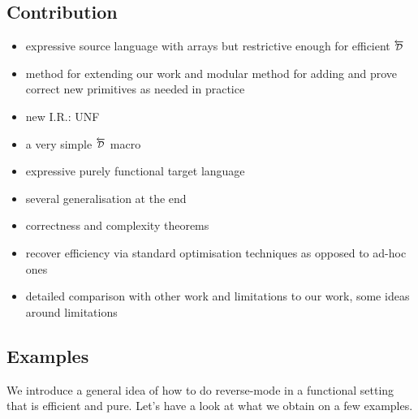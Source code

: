 \subsection{Contribution}

\begin{itemize}
    \item expressive source language with arrays but restrictive enough for efficient $\Dsynrevsymbol$
    \item method for extending our work and modular method for adding and prove correct new primitives as needed in practice 
    \item new I.R.: UNF
    \item a very simple $\Dsynrevsymbol$ macro
    \item expressive purely functional target language
    \item several generalisation at the end
    \item correctness and complexity theorems
    \item recover efficiency via standard optimisation techniques as opposed to ad-hoc ones
    \item detailed comparison with other work and limitations to our work, some ideas around limitations
\end{itemize}

\subsection{Examples}


We introduce a general idea of how to do reverse-mode in a functional setting that is efficient and pure. 
Let's have a look at what we obtain on a few examples.


